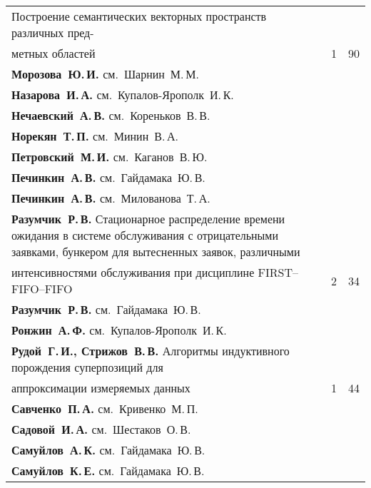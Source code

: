 {\begin{tabular}{p{388pt}rr}
Построение семантических векторных пространств различных пред-\linebreak
\vspace*{-12pt}\\
\hspace*{23pt}метных областей\dotfill&1&90\\
\textbf{Морозова~Ю.\,И.} см.~Шарнин~М.\,М.&&\\
\textbf{Назарова~И.\,А.} см.~Купалов-Ярополк~И.\,К.&&\\
\textbf{Нечаевский~А.\,В.} см.~Кореньков~В.\,В.&&\\
\textbf{Норекян~Т.\,П.} см.~Минин~В.\,А.&&\\
\textbf{Петровский~М.\,И.} см.~Каганов~В.\,Ю.&&\\
\textbf{Печинкин~А.\,В.} см.~Гайдамака~Ю.\,В.&&\\
\textbf{Печинкин~А.\,В.} см.~Милованова~Т.\,А.&&\\
\hangindent=23pt\noindent\textbf{Разумчик~Р.\,В.}
Стационарное распределение времени ожидания в системе обслуживания с
отрицательными заявками, бункером для вытесненных заявок, различными\linebreak
\vspace*{-12pt}\\
\hspace*{23pt}интенсивностями обслуживания при дисциплине FIRST--FIFO--FIFO\dotfill&2&34\\
\textbf{Разумчик~Р.\,В.} см.~Гайдамака~Ю.\,В.&&\\
\textbf{Ронжин~А.\,Ф.} см.~Купалов-Ярополк~И.\,К.&&\\
\textbf{Рудой~Г.\,И., Стрижов~В.\,В.}
Алгоритмы индуктивного порождения суперпозиций для\linebreak
\vspace*{-12pt}\\
\hspace*{23pt}аппроксимации измеряемых данных\dotfill&1&44\\
\textbf{Савченко~П.\,А.} см.~Кривенко~М.\,П.&&\\
\textbf{Садовой~И.\,А.} см.~Шестаков~О.\,В.&&\\
\textbf{Самуйлов~А.\,К.} см.~Гайдамака~Ю.\,В.&&\\
\textbf{Самуйлов~К.\,Е.} см.~Гайдамака~Ю.\,В.&&\\
\end{tabular}
}

\pagebreak

\def\leftkol{АВТОРСКИЙ УКАЗАТЕЛЬ ЗА 2013 г.} %

